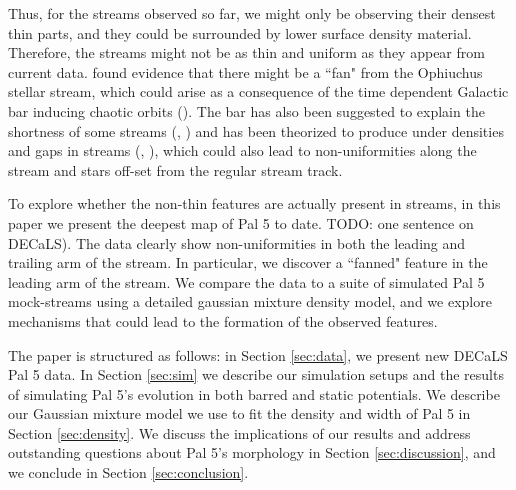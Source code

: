 \documentclass[modern]{aastex62}
\newcommand{\todo}[1]{{\color{red} TODO: #1}}
\begin{document}
Thus, for the streams observed so far, we might only be observing their densest thin parts, and they could be surrounded by lower surface density material. Therefore, the streams might not be as thin and uniform as they appear from current data. \citet{Sesar:2016} found evidence that there might be a ``fan" from the Ophiuchus stellar stream, which could arise as a consequence of the time dependent Galactic bar inducing chaotic orbits (\citealt{Price-Whelan:2016b}). The bar has also been suggested to explain the shortness of some streams (\citealt{Hattori:2016}, \citealt{Pearson:2017}) and has been theorized to produce under densities and gaps in streams (\citealt{Erkal:2017}, \citealt{Pearson:2017}), which could also lead to non-uniformities along the stream and stars off-set from the regular stream track.


	
To explore whether the non-thin features are actually present in streams, in this paper we present the deepest map of Pal 5 to date. \todo{one sentence on DECaLS)}. The data clearly show non-uniformities in both the leading and trailing arm of the stream. In particular, we discover a ``fanned" feature in the leading arm of the stream. We compare the data to a suite of simulated Pal 5 mock-streams using a detailed gaussian mixture density model, and we explore mechanisms that could lead to the formation of the observed features.  

The paper is structured as follows: in Section \ref{sec:data}, we present new DECaLS Pal 5 data. In Section \ref{sec:sim} we describe our simulation setups and the results of simulating Pal 5's evolution in both barred and static potentials. We describe our Gaussian mixture model we use to fit the density and width of Pal 5 in Section \ref{sec:density}. We discuss the implications of our results and address outstanding questions about Pal 5's morphology in Section \ref{sec:discussion}, and we conclude in Section \ref{sec:conclusion}. 
\end{document}

